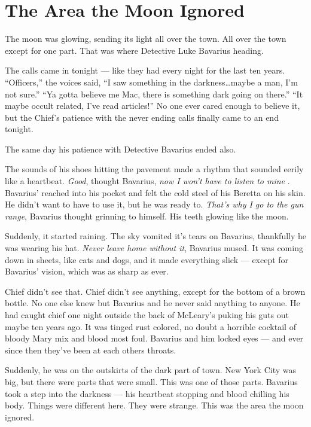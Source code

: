\chapter{The Area the Moon Ignored}



The moon was glowing, sending its light all over the town. All over
the town except for one part. That was where Detective Luke
Bavarius heading.



The calls came in tonight --- like they had every night for the
last ten years. ``Officers,'' the voices said, ``I
saw something in the darkness{\ldots}maybe a man, I'm not sure.''
``Ya gotta believe me Mac, there is something dark going on
there.'' ``It maybe occult related, I've read
articles!'' No one ever cared enough to believe it, but the
Chief's patience with the never ending calls finally came to an end
tonight.



The same day his patience with Detective Bavarius ended also.



The sounds of his shoes hitting the pavement made a rhythm that
sounded eerily like a heartbeat. {\em Good}, thought Bavarius,
{\em now I won't have to listen to mine} . Bavarius' reached into
his pocket and felt the cold steel of his Beretta on his skin. He
didn't want to have to use it, but he was ready to. {\em That's why I
go to the gun range}, Bavarius thought grinning to himself. His
teeth glowing like the moon.



Suddenly, it started raining. The sky vomited it's tears on
Bavarius, thankfully he was wearing his hat. {\em Never leave home
without it}, Bavarius mused. It was coming down in sheets, like
cats and dogs, and it made everything slick --- except for
Bavarius' vision, which was as sharp as ever.



Chief didn't see that. Chief didn't see anything, except for the
bottom of a brown bottle. No one else knew but Bavarius and he
never said anything to anyone. He had caught chief one night
outside the back of McLeary's puking his guts out maybe ten years
ago. It was tinged rust colored, no doubt a horrible cocktail of
bloody Mary mix and blood most foul. Bavarius and him locked eyes
--- and ever since then they've been at each others
throats.



Suddenly, he was on the outskirts of the dark part of town. New
York City was big, but there were parts that were small. This was
one of those parts. Bavarius took a step into the darkness ---
his heartbeat stopping and blood chilling his body. Things were
different here. They were strange. This was the area the moon
ignored.



